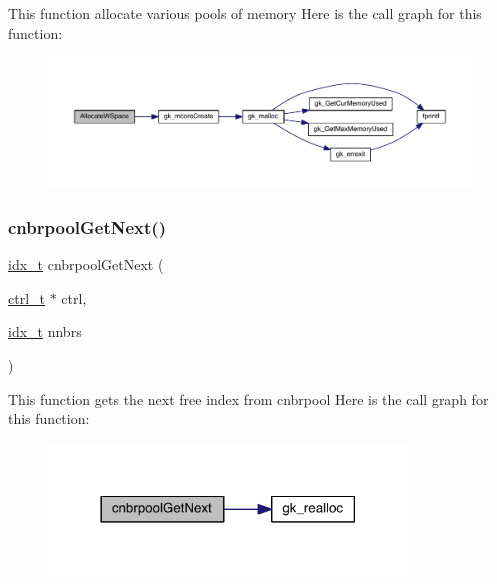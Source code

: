 This function allocate various pools of memory Here is the call graph for this function\+:\nopagebreak
\begin{figure}[H]
\begin{center}
\leavevmode
\includegraphics[width=350pt]{a00984_aaedfa12582d61baba3729f8204d9fddb_cgraph}
\end{center}
\end{figure}
\mbox{\label{a00984_a5c7982f300512c943ce53a0531529ae8}} 
\subsubsection{\texorpdfstring{cnbrpool\+Get\+Next()}{cnbrpoolGetNext()}}
{\footnotesize\ttfamily \hyperlink{a00876_aaa5262be3e700770163401acb0150f52}{idx\+\_\+t} cnbrpool\+Get\+Next (\begin{DoxyParamCaption}\item[{\hyperlink{a00742}{ctrl\+\_\+t} $\ast$}]{ctrl,  }\item[{\hyperlink{a00876_aaa5262be3e700770163401acb0150f52}{idx\+\_\+t}}]{nnbrs }\end{DoxyParamCaption})}

This function gets the next free index from cnbrpool Here is the call graph for this function\+:\nopagebreak
\begin{figure}[H]
\begin{center}
\leavevmode
\includegraphics[width=270pt]{a00984_a5c7982f300512c943ce53a0531529ae8_cgraph}
\end{center}
\end{figure}
\mbox{\label{a00984_ab24df9968589b0cfabb8f1a8b4661d0d}} 
